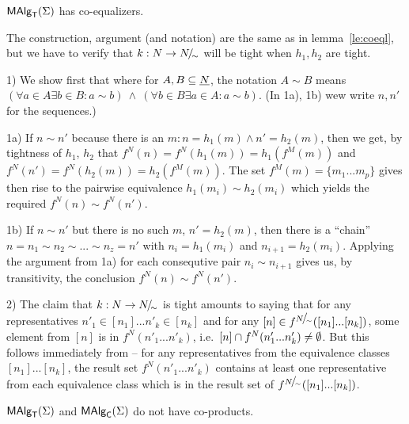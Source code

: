 \documentclass[10pt]{article}
\begin{document}
\begin{Fact}
$\mbox{\rm\sf MAlg}_{\sf T}(\Sigma)$ has co-equalizers.
\end{Fact}

\begin{Proof}
The construction, argument (and notation) are the same as in
lemma~\ref{le:coeql}, but we have to verify that $k:N\rightarrow
N\!{\textstyle /}\!_{\sim}$ will be tight when $h_1,h_2$ are tight.

1) We show first that  where for
$A,B\subseteq\underline {N}$, the notation $A\sim B$ means $(\forall a\in
A\exists b\in B:a\sim b)\ \land\ (\forall b\in B\exists a\in A:a\sim
b)$. (In 1a), 1b) wew write $n,n'$ for the sequences.)

1a) If $n\sim n'$ because there is an $m:n=h_1(m)\land n'=h_2(m)$,
then we get, by tightness of $h_1$, $h_2$ that
$f^N(n)=f^N(h_1(m))=h_1(f^M(m))$ and
$f^N(n')=f^N(h_2(m))=h_2(f^M(m))$. The set $f^M(m)=\{m_1...m_p\}$
gives then rise to the pairwise equivalence $h_1(m_i)\sim h_2(m_i)$
which yields the required $f^N(n)\sim f^N(n')$.

1b) If $n\sim n'$ but there is no such $m$, %
$n'=h_2(m)$, then there is a ``chain'' $n=n_1\sim n_2\sim...\sim
n_z=n'$ with $n_i=h_1(m_i)$ and $n_{i+1}=h_2(m_i)$.
Applying the argument from 1a) for each consequtive pair $n_i\sim
n_{i+1}$ gives us, by transitivity, the conclusion $f^N(n)\sim
f^N(n')$.

2) The claim that $k:N\rightarrow N\!{\textstyle /}\!_{\sim}$ is tight amounts to saying
that for any representatives $n'_1\in[n_1]...n'_k\in[n_k]$ and for any
$[n]\in f^{N\!{\textstyle /}\!_{\sim}}([n_1]...[n_k])$, some element from $[n]$ is
in $f^N(n'_1...n'_k)$, i.e.\ $[n]\cap f^N(n'_1...n'_k)\not=\emptyset$.  But
this follows immediately from  -- for any representatives
from the equivalence classes $[n_1]...[n_k]$, the result set
$f^N(n'_1...n'_k)$ contains at least one representative from each
equivalence class which is in the result set of
$f^{N\!{\textstyle /}\!_{\sim}}([n_1]...[n_k])$.
\end{Proof}


\begin{Fact}
$\mbox{\rm\sf MAlg}_{\sf T}(\Sigma)$ and $\mbox{\rm\sf MAlg}_{\sf C}(\Sigma)$ do not have co-products.
\end{Fact}
\end{document}
